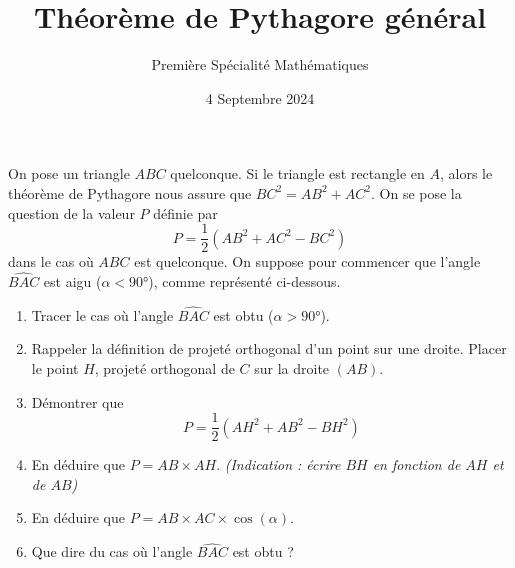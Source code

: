 \documentclass{article}
\title{Théorème de Pythagore \og général \fg}
\date{4 Septembre 2024}
\author{Première Spécialité Mathématiques}
\begin{document}
\maketitle

On pose un triangle $ABC$ quelconque. Si le triangle est rectangle en $A$, alors le théorème de Pythagore nous assure que $BC^2 = AB^2 + AC^2$. On se pose la question de la valeur $P$ définie par
\begin{equation*}
P = \dfrac{1}{2}\left(AB^2 + AC^2 - BC^2\right)
\end{equation*}
dans le cas où $ABC$ est quelconque. On suppose pour commencer que l'angle $\widehat{BAC}$ est aigu ($\alpha < 90°$), comme représenté ci-dessous.

\begin{center}
\end{center}
\begin{enumerate}[label=\emph{\arabic*)}]
\item Tracer le cas où l'angle $\widehat{BAC}$ est obtu ($\alpha > 90°$).
\item Rappeler la définition de projeté orthogonal d'un point sur une droite. Placer le point $H$, projeté orthogonal de $C$ sur la droite $(AB)$.
\item Démontrer que 
\begin{equation*}
P = \dfrac{1}{2}\left(AH^2 + AB^2 - BH^2\right)
\end{equation*}
\item En déduire que $P = AB \times AH$. \emph{(Indication : écrire $BH$ en fonction de $AH$ et de $AB$)}
\item En déduire que $P = AB \times AC \times \cos(\alpha)$.
\item Que dire du cas où l'angle $\widehat{BAC}$ est obtu ?
\end{enumerate}
\end{document}
